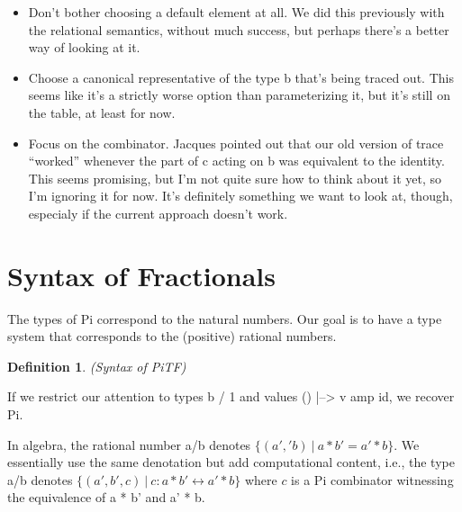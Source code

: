 \documentclass{sigplanconf}
\newtheorem{definition}[theorem]{Definition}
\begin{document}
\begin{itemize}

\item Don't bother choosing a default element at all. We did this previously
with the relational semantics, without much success, but perhaps there's a
better way of looking at it.

\item Choose a canonical representative of the type {{b}} that's being traced
out. This seems like it's a strictly worse option than parameterizing it, but
it's still on the table, at least for now.

\item Focus on the combinator. Jacques pointed out that our old version of trace
``worked'' whenever the part of {{c}} acting on {{b}} was equivalent to the
identity. This seems promising, but I'm not quite sure how to think about it
yet, so I'm ignoring it for now. It's definitely something we want to look at,
though, especialy if the current approach doesn't work.

\end{itemize}


\section{Syntax of Fractionals}

The types of {{Pi}} correspond to the natural numbers. Our goal is to have a
type system that corresponds to the (positive) rational numbers. 

\begin{definition}{(Syntax of {{PiTF}})}
\label{def:PiTF}
%
\end{definition}

If we restrict our attention to types {{b / 1}} and values {{ () |--> v amp id}},
we recover {{Pi}}. 

In algebra, the rational number {{a/b}} denotes 
$\{ (a','b) ~|~ a * b' = a' * b \}$. We essentially use the same denotation but
add computational content, i.e., the type {{a/b}} denotes
$\{ (a',b',c) ~|~ c : a * b' \leftrightarrow a' * b \}$ where $c$ is a {{Pi}}
combinator witnessing the equivalence of {{a * b'}} and {{a' * b}}. 
\end{document}
